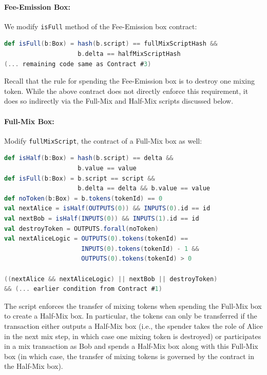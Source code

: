 \documentclass[runningheads]{llncs}
\begin{document}
\paragraph{Fee-Emission Box:}
We modify \texttt{isFull} method of the Fee-Emission box contract:

\begin{lstlisting}[language=Scala,caption={Fee emission script with confinement},label=feeEmissionScriptWithConfinement]
def isFull(b:Box) = hash(b.script) == fullMixScriptHash && 
                    b.delta == halfMixScriptHash
(... remaining code same as Contract #3)                    
\end{lstlisting}

Recall that the rule for spending the Fee-Emission box is to destroy one mixing token. While the above contract does not directly enforce this requirement, it does so indirectly via the Full-Mix and Half-Mix scripts discussed below.

\paragraph{Full-Mix Box:}

Modify \texttt{fullMixScript}, the contract of a Full-Mix box as well:

\begin{lstlisting}[language=Scala,caption={Full mix script with confinement},label=fullMixScriptWithConfinement]
def isHalf(b:Box) = hash(b.script) == delta && 
                    b.value == value
def isFull(b:Box) = b.script == script &&
                    b.delta == delta && b.value == value
def noToken(b:Box) = b.tokens(tokenId) == 0
val nextAlice = isHalf(OUTPUTS(0)) && INPUTS(0).id == id
val nextBob = isHalf(INPUTS(0)) && INPUTS(1).id == id
val destroyToken = OUTPUTS.forall(noToken)
val nextAliceLogic = OUTPUTS(0).tokens(tokenId) == 
                     INPUTS(0).tokens(tokenId) - 1 && 
                     OUTPUTS(0).tokens(tokenId) > 0

((nextAlice && nextAliceLogic) || nextBob || destroyToken) 
&& (... earlier condition from Contract #1)
\end{lstlisting}

The script enforces the transfer of mixing tokens when spending the Full-Mix box to create a Half-Mix box. In particular, the tokens can only be transferred if the transaction either outputs a Half-Mix box (i.e., the spender takes the role of Alice in the next mix step, in which case one mixing token is destroyed) or participates in a mix transaction as Bob and spends a Half-Mix box along with this Full-Mix box (in which case, the transfer of mixing tokens is governed by the contract in the Half-Mix box).
\end{document}
